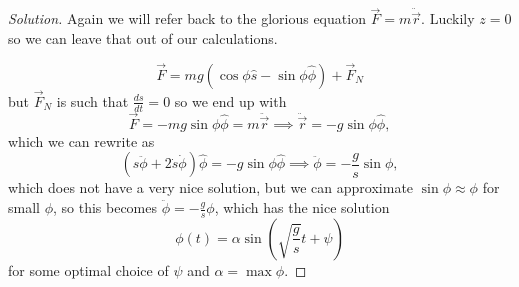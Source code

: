 \begin{proof}[Solution]
Again we will refer back to the glorious equation $\vec{F} = m
\ddot{\vec{r}}$. Luckily $z = 0$ so we can leave that out of our
calculations.

\[ \vec{F} = mg(\cos \phi \hat{s} - \sin \phi \hat{\phi}) + \vec{F}_N \]
but $\vec{F}_N$ is such that $\frac{ds}{dt} = 0$ so we end up with
\[ \vec{F} = -mg \sin \phi \hat{\phi} = m \ddot{\vec{r}} \implies
\ddot{\vec{r}} = -g \sin \phi \hat{\phi}, \]
which we can rewrite as
\[ \left(s \ddot{\phi} + 2 \dot{s} \dot{\phi} \right) \hat{\phi} = -g
\sin \phi \hat{\phi} \implies \ddot{\phi} = -\frac{g}{s} \sin \phi, \]
which does not have a very nice solution, but we can approximate $\sin
\phi \approx \phi$ for small $\phi$, so this becomes $\ddot{\phi} =
-\frac{g}{s} \phi$, which has the nice solution
\[ \phi(t) = \alpha \sin\left( \sqrt{\frac{g}{s}} t + \psi \right) \]
for some optimal choice of $\psi$ and $\alpha = \max \phi$.
\end{proof}
